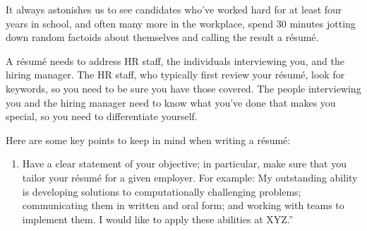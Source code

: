 \documentclass[10pt,openany,twoside,letterpaper,extrafontsizes]{memoir}
\begin{document}
\begin{Spacing}{\gettingReadySpacing}
\noindent
It always astonishes us to see candidates who've
worked hard for at least four years in school, and often many
more in the workplace, spend $30$ minutes jotting down random factoids
about themselves and calling the result a r\'{e}sum\'{e}.

A r\'{e}sum\'{e} needs to address HR staff, the individuals interviewing you, and the hiring manager.
The HR staff, who typically first review your r\'{e}sum\'{e}, look for keywords,
so you need to be sure you have those covered.
The people interviewing you and the hiring manager need to know what you've done that makes you special,
so you need to differentiate yourself.

Here are some key points to keep in mind when writing a r\'{e}sum\'{e}:
\begin{enumerate}[label=(\arabic*.), ref=(\arabic*.)]
  \item Have a clear statement of your objective; in particular, make sure that you tailor your r\'{e}sum\'{e} for a given employer.
For example: My outstanding ability is developing solutions
to computationally challenging problems; communicating them in written and oral form; and working
with teams to implement them. I would like to apply these abilities at XYZ.''


\end{enumerate}
\end{Spacing}
\end{document}
